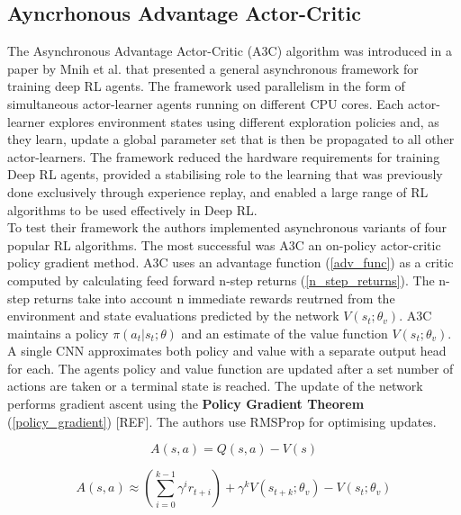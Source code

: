 \documentclass[10pt,journal,compsoc]{IEEEtran}
\begin{document}
\subsection{Ayncrhonous Advantage Actor-Critic}
The Asynchronous Advantage Actor-Critic (A3C) algorithm was introduced in a paper by Mnih et al. \cite{mnih2016async} that presented a general asynchronous framework for training deep RL agents. The framework used parallelism in the form of simultaneous actor-learner agents running on different CPU cores. Each actor-learner explores environment states using different exploration policies and, as they learn, update a global parameter set that is then be propagated to all other actor-learners. The framework reduced the hardware requirements for training Deep RL agents, provided a stabilising role to the learning that was previously done exclusively through experience replay, and enabled a large range of RL algorithms to be used effectively in Deep RL.
\\
To test their framework the authors implemented asynchronous variants of four popular RL algorithms. The most successful was A3C an on-policy actor-critic policy gradient method. A3C uses an advantage function (\ref{adv_func}) as a critic computed by calculating feed forward n-step returns (\ref{n_step_returns}). The n-step returns take into account n immediate rewards reutrned from the environment and state evaluations predicted by the network \begin{math}V(s_t;\theta_v)\end{math}. A3C maintains a policy \begin{math}\pi(a_t|s_t;\theta)\end{math} and an estimate of the value function \begin{math}V(s_t;\theta_v)\end{math}. A single CNN approximates both policy and value with a separate output head for each. The agents policy and value function are updated after a set number of actions are taken or a terminal state is reached. The update of the network performs gradient ascent using the \textbf{Policy Gradient Theorem} (\ref{policy_gradient})  [REF]. The authors use RMSProp \cite{hinton2012rmsprop} for optimising updates.

\begin{equation}
\label{adv_func}
A(s,a) = Q(s,a) - V(s)
\end{equation}

\begin{equation}
\label{n_step_returns}
A(s,a) \approx (\sum\limits_{i=0}^{k-1}\gamma^ir_{t+i}) + \gamma^kV(s_{t+k};\theta_v) - V(s_t;\theta_v)
\end{equation}
\end{document}
